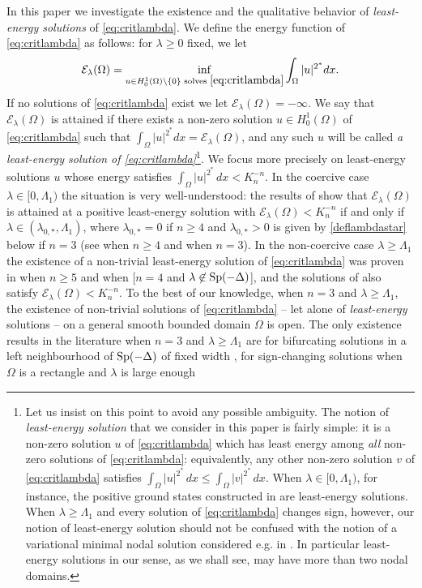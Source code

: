 \documentclass[10pt]{amsart}
\numberwithin{equation}{section}
\newcommand{\Sp}{{\rm Sp}}
\newcommand{\Om}{\Omega}
\theoremstyle{plain}
\theoremstyle{remark}
\begin{document}
\medskip

In this paper we investigate the existence and the qualitative behavior of \emph{least-energy solutions} of \eqref{eq:critlambda}. We define the energy function of \eqref{eq:critlambda} as follows: for $\lambda \ge 0$ fixed, we let
\begin{equation} \label{minimalenergy}
\mathcal{E}_\lambda(\Om) = \inf_{u \in H^1_0(\Om)\backslash \{0\} \text{ solves } \eqref{eq:critlambda}} \int_{\Om}|u|^{2^*}dx.  
 \end{equation}
If no solutions of \eqref{eq:critlambda} exist we let $\mathcal{E}_{\lambda}(\Om) = - \infty$. We say that $\mathcal{E}_\lambda(\Om)$ is attained if there exists a non-zero solution $u \in H^1_0(\Om)$ of \eqref{eq:critlambda}  such that $\int_\Om |u|^{2^*}dx = \mathcal{E}_\lambda(\Om)$, and any such  $u$ will be called \emph{a least-energy solution of \eqref{eq:critlambda}}\footnote{Let us insist on this point to avoid any possible ambiguity. The notion of \emph{least-energy solution} that we consider in this paper is fairly simple: it is a non-zero solution $u$ of \eqref{eq:critlambda} which has least energy among \emph{all} non-zero solutions of \eqref{eq:critlambda}: equivalently, any other non-zero solution $v$ of \eqref{eq:critlambda} satisfies $\int_{\Om} |u|^{2^*}\, dx \le  \int_{\Om} |v|^{2^*}\, dx$. When $ \lambda \in [0,\Lambda_1)$, for instance, the positive ground states constructed in \cite{BN} are least-energy solutions. When $\lambda \ge \Lambda_1$ and every solution of \eqref{eq:critlambda} changes sign, however, our notion of least-energy solution should not be confused with the notion of a variational minimal nodal solution considered e.g. in \cite{BartschWethWillem}. In particular least-energy solutions in our sense, as we shall see, may have more than two nodal domains.}.  We focus more precisely on least-energy solutions $u$ whose energy satisfies $\int_{\Om} |u|^{2^*} \, dx <K_n^{-n}$. In the coercive case $\lambda \in [0, \Lambda_1)$ the situation is very well-understood: the results of \cite{BN, Druetdim3} show that $\mathcal{E}_\lambda(\Om)$ is attained at a positive least-energy solution with $\mathcal{E}_\lambda(\Om) < K_n^{-n}$ if and only if $\lambda \in (\lambda_{0,*}, \Lambda_1)$, where $\lambda_{0,*} = 0$ if $n \ge 4$ and $\lambda_{0,*} >0$ is given by \eqref{deflambdastar} below if $n=3$ (see \cite{BN} when $n \ge 4$ and \cite{Druetdim3} when $n=3$). In the non-coercive case $\lambda \ge \Lambda_1$ the existence of a non-trivial least-energy solution of \eqref{eq:critlambda}  was proven in \cite{SzulkinWethWillem} when $n \ge 5$ and when [$n=4$ and $\lambda \not \in \Sp(-\Delta)$], and the solutions of \cite{SzulkinWethWillem} also satisfy $\mathcal{E}_\lambda(\Om) < K_n^{-n}$. To the best of our knowledge, when $n=3$ and $\lambda \ge \Lambda_1$, the existence of non-trivial solutions of \eqref{eq:critlambda} -- let alone of \emph{least-energy} solutions -- on a general smooth bounded domain $\Om$ is open. The only existence results in the literature when $n =3$ and $\lambda \ge \Lambda_1$ are for bifurcating solutions in a left neighbourhood of $\Sp(-\Delta)$ of fixed width \cite{CeramiFortunatoStruwe}, for sign-changing solutions when $\Om$ is a rectangle and $\lambda$ is large enough 
\end{document}
